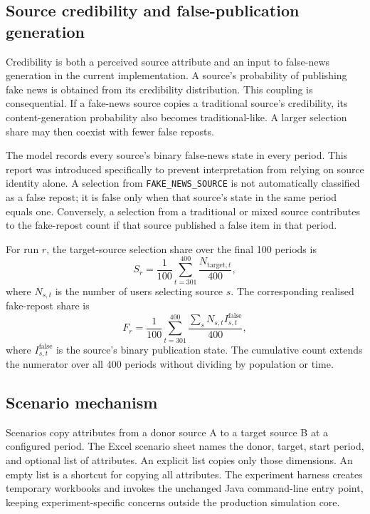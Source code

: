 \subsection{Source credibility and false-publication generation}

Credibility is both a perceived source attribute and an input to false-news generation in the current implementation. A source's probability of publishing fake news is obtained from its credibility distribution. This coupling is consequential. If a fake-news source copies a traditional source's credibility, its content-generation probability also becomes traditional-like. A larger selection share may then coexist with fewer false reposts.

The model records every source's binary false-news state in every period. This report was introduced specifically to prevent interpretation from relying on source identity alone. A selection from \texttt{FAKE\_NEWS\_SOURCE} is not automatically classified as a false repost; it is false only when that source's state in the same period equals one. Conversely, a selection from a traditional or mixed source contributes to the fake-repost count if that source published a false item in that period.

For run $r$, the target-source selection share over the final 100 periods is
\begin{equation}
S_r = \frac{1}{100}\sum_{t=301}^{400}\frac{N_{\mathrm{target},t}}{400},
\end{equation}
where $N_{s,t}$ is the number of users selecting source $s$. The corresponding realised fake-repost share is
\begin{equation}
F_r = \frac{1}{100}\sum_{t=301}^{400}\frac{\sum_s N_{s,t}I_{s,t}^{\mathrm{false}}}{400},
\end{equation}
where $I_{s,t}^{\mathrm{false}}$ is the source's binary publication state. The cumulative count extends the numerator over all 400 periods without dividing by population or time.

\subsection{Scenario mechanism}

Scenarios copy attributes from a donor source A to a target source B at a configured period. The Excel scenario sheet names the donor, target, start period, and optional list of attributes. An explicit list copies only those dimensions. An empty list is a shortcut for copying all attributes. The experiment harness creates temporary workbooks and invokes the unchanged Java command-line entry point, keeping experiment-specific concerns outside the production simulation core.

